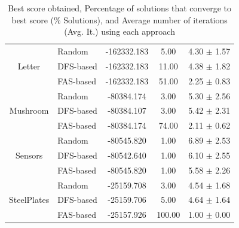 \begin{table}[ h ]
\begin{tabular}{|c|l|c|c|c|}
			\multirow{3}{*}{Letter} & Random & -162332.183 & 5.00 & 4.30 $\pm$ 1.57 \\ \cline{2-5} 
					& DFS-based & -162332.183 & 11.00 & 4.38 $\pm$ 1.82 \\ \cline{2-5}
					& FAS-based & -162332.183 & 51.00 & 2.25 $\pm$ 0.83 \\ \hline
			\multirow{3}{*}{Mushroom} & Random & -80384.174 & 3.00 & 5.30 $\pm$ 2.56 \\ \cline{2-5} 
					& DFS-based & -80384.107 & 3.00 & 5.42 $\pm$ 2.31 \\ \cline{2-5}
					& FAS-based & -80384.174 & 74.00 & 2.11 $\pm$ 0.62 \\ \hline
			\multirow{3}{*}{Sensors} & Random & -80545.820 & 1.00 & 6.89 $\pm$ 2.53 \\ \cline{2-5} 
					& DFS-based & -80542.640 & 1.00 & 6.10 $\pm$ 2.55 \\ \cline{2-5}
					& FAS-based & -80545.820 & 1.00 & 5.58 $\pm$ 2.26 \\ \hline
			\multirow{3}{*}{SteelPlates} & Random & -25159.708 & 3.00 & 4.54 $\pm$ 1.68 \\ \cline{2-5} 
					& DFS-based & -25159.706 & 5.00 & 4.64 $\pm$ 1.64 \\ \cline{2-5}
					& FAS-based & -25157.926 & 100.00 & 1.00 $\pm$ 0.00 \\ \hline
		\end{tabular}
		\caption{Best score obtained, Percentage of solutions that converge to best score (\% Solutions), and Average number of iterations (Avg. It.) using each approach}
		\label{tab:comparison}
	\end{table}
	
